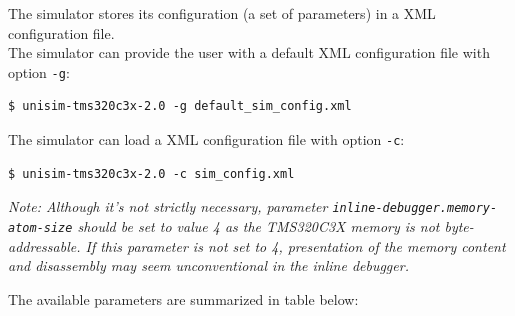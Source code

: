 \noindent The simulator stores its configuration (a set of parameters) in a XML configuration file. 
\newline\\
\noindent The simulator can provide the user with a default XML configuration file with option \texttt{-g}:

\begin{verbatim}
$ unisim-tms320c3x-2.0 -g default_sim_config.xml
\end{verbatim}

\noindent The simulator can load a XML configuration file with option \texttt{-c}:

\begin{verbatim}
$ unisim-tms320c3x-2.0 -c sim_config.xml
\end{verbatim}

\noindent \textit{Note: Although it's not strictly necessary, parameter \texttt{inline-debugger.memory-atom-size} should be set to value 4 as the TMS320C3X memory is not byte-addressable. If this parameter is not set to 4, presentation of the memory content and disassembly may seem unconventional in the inline debugger.}

\noindent The available parameters are summarized in table below:


